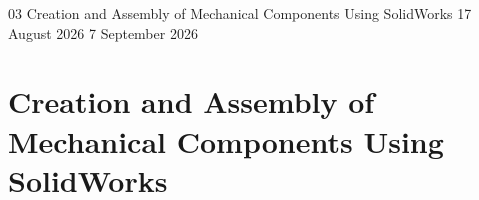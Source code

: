 \begin{refsection}

  \GenerateCoverPage
  {03} %
  {Creation and Assembly of Mechanical Components Using SolidWorks} %
  {17 August 2026} %
  {7 September 2026} %

  \noindent

  \chapter{Creation and Assembly of Mechanical Components Using SolidWorks}

  
  
  
  
  
  
  
  

\end{refsection}

\setcounter{section}{0}
